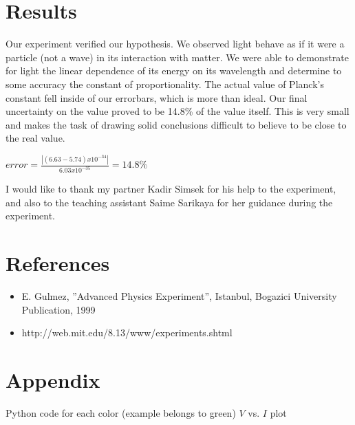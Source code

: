 \documentclass[aps,nofootinbib,onecolumn,groupedaddress,a4paper]{revtex4}
\begin{document}
\section{Results}
Our experiment verified our hypothesis. We observed
light behave as if it were a particle (not a wave) in its interaction with matter. We were able to demonstrate for
light the linear dependence of its energy on its wavelength
and determine to some accuracy the constant of proportionality. The actual value of Planck’s constant fell inside of our errorbars, which is more than ideal. Our final
uncertainty on the value proved to be 14.8\% of the value
itself. This is very small and makes the task of drawing
solid conclusions difficult to believe to be close to the real value. 

\begin{center}
$error=\frac{|(6.63-5.74)x10^{-34}|}{6.03x10^{-35}}=14.8\%$
\end{center}


\begin{acknowledgements}
I would like to thank my partner Kadir Simsek  for his help to the experiment, and also to the teaching assistant Saime Sarikaya for her guidance during the experiment.
\end{acknowledgements}

\section{References}
\begin{itemize}
\item 	E. Gulmez, ”Advanced Physics Experiment”, Istanbul, Bogazici University Publication, 1999

\item http://web.mit.edu/8.13/www/experiments.shtml
\end{itemize}

\section{Appendix}


Python code for each color (example belongs to green) $V$ vs. $I$ plot
\end{document}

